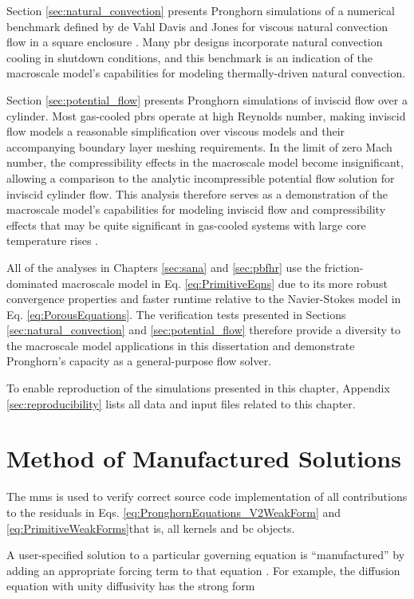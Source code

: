 Section \ref{sec:natural_convection} presents Pronghorn simulations of a numerical benchmark defined by de Vahl Davis and Jones for viscous natural convection flow in a square enclosure \cite{davis}. Many \gls{pbr} designs incorporate natural convection cooling in shutdown conditions, and this benchmark is an indication of the macroscale model's capabilities for modeling thermally-driven natural convection.

Section \ref{sec:potential_flow} presents Pronghorn simulations of inviscid flow over a cylinder. Most gas-cooled \glspl{pbr} operate at high Reynolds number, making inviscid flow models a reasonable simplification over viscous models and their accompanying boundary layer meshing requirements. In the limit of zero Mach number, the compressibility effects in the macroscale model become insignificant, allowing a comparison to the analytic incompressible potential flow solution for inviscid cylinder flow. This analysis therefore serves as a demonstration of the macroscale model's capabilities for modeling inviscid flow and compressibility effects that may be quite significant in gas-cooled systems with large core temperature rises \cite{martineau}.

All of the analyses in Chapters \ref{sec:sana} and \ref{sec:pbfhr} use the friction-dominated macroscale model in Eq. \eqref{eq:PrimitiveEqns} due to its more robust convergence properties and faster runtime relative to the Navier-Stokes model in Eq. \eqref{eq:PorousEquations}. The verification tests presented in Sections \ref{sec:natural_convection} and \ref{sec:potential_flow} therefore provide a diversity to the macroscale model applications in this dissertation and demonstrate Pronghorn's capacity as a general-purpose flow solver.

To enable reproduction of the simulations presented in this chapter, Appendix \ref{sec:reproducibility} lists all data and input files related to this chapter.

\section{Method of Manufactured Solutions}
\label{sec:mms}

The \gls{mms} is used to verify correct source code implementation of all contributions to the residuals in Eqs. \eqref{eq:PronghornEquations_V2WeakForm} and \eqref{eq:PrimitiveWeakForms}\mdash that is, all kernels and \gls{bc} objects.

A user-specified solution to a particular governing equation is ``manufactured'' by adding an appropriate forcing term to that equation \cite{roache}. For example, the diffusion equation with unity diffusivity has the strong form

